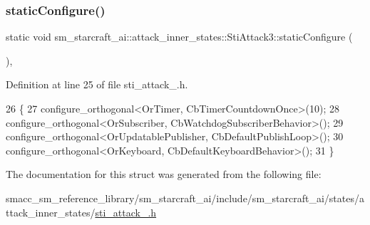 \subsubsection{\texorpdfstring{static\+Configure()}{staticConfigure()}}
{\footnotesize\ttfamily static void sm\+\_\+starcraft\+\_\+ai\+::attack\+\_\+inner\+\_\+states\+::\+Sti\+Attack3\+::static\+Configure (\begin{DoxyParamCaption}{ }\end{DoxyParamCaption})\hspace{0.3cm}{\ttfamily [inline]}, {\ttfamily [static]}}



Definition at line 25 of file sti\+\_\+attack\+\_.\+h.


\begin{DoxyCode}
26   \{
27     configure\_orthogonal<OrTimer, CbTimerCountdownOnce>(10);
28     configure\_orthogonal<OrSubscriber, CbWatchdogSubscriberBehavior>();
29     configure\_orthogonal<OrUpdatablePublisher, CbDefaultPublishLoop>();
30     configure\_orthogonal<OrKeyboard, CbDefaultKeyboardBehavior>();
31   \}
\end{DoxyCode}


The documentation for this struct was generated from the following file\+:\begin{DoxyCompactItemize}
\item 
smacc\+\_\+sm\+\_\+reference\+\_\+library/sm\+\_\+starcraft\+\_\+ai/include/sm\+\_\+starcraft\+\_\+ai/states/attack\+\_\+inner\+\_\+states/\hyperlink{sti__attack__3_8h}{sti\+\_\+attack\+\_.\+h}\end{DoxyCompactItemize}
